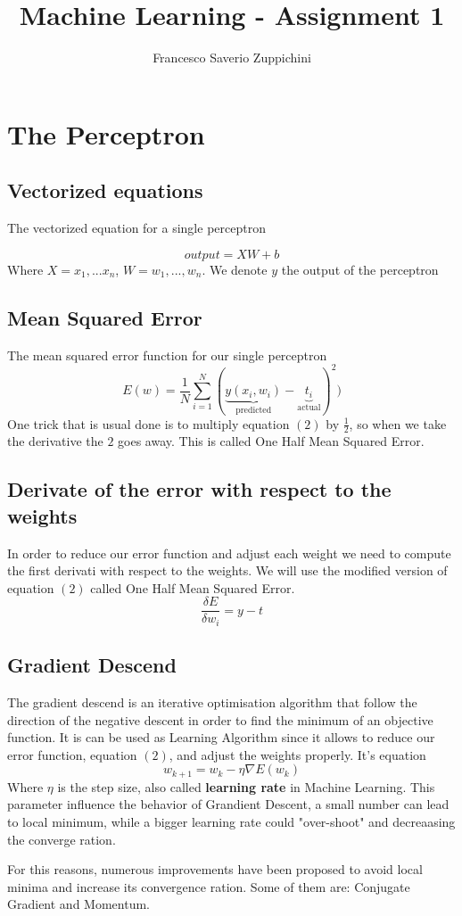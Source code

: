 \documentclass[11pt]{article}
\author{Francesco Saverio Zuppichini}
\title{Machine Learning - Assignment 1}
\begin{document}
\maketitle

\section{The Perceptron}
\subsection{Vectorized equations}
The vectorized equation for a single perceptron

\begin{equation}
output = XW + b
\end{equation}
Where $X = {x_1, ... x_n}$, $W = {w_1, ..., w_n}$. We denote $y$ the output of the perceptron

\subsection{Mean Squared Error}
The mean squared error function for our single perceptron
\begin{equation}
	E(w) = \frac{1}{N}\sum_{i = 1}^N(\underbrace{y(x_i,w_i)}_{\text{predicted}} - \underbrace{t_i}_{\text{actual}})^2)
\end{equation}
One trick that is usual done is to multiply equation $(2)$ by $\frac{1}{2}$, so when we take the derivative the $2$ goes away. This is called One Half Mean Squared Error.

\subsection{Derivate of the error with respect to the weights}
In order to reduce our error function and adjust each weight we need to compute the first derivati with respect to the weights. We will use the modified version of equation $(2)$ called One Half Mean Squared Error.
\begin{equation}
\frac{\delta E}{\delta w_i}	= y - t
	
\end{equation}
\subsection{Gradient Descend}
The gradient descend is an iterative optimisation algorithm that follow the direction of the negative descent in order to find the minimum of an objective function. It is can be used as Learning Algorithm since it allows to reduce our error function, equation $(2)$, and adjust the weights properly.
It's equation
\begin{equation}
	w_{k + 1} = w_k - \eta \nabla E(w_k)
\end{equation}
Where $\eta$ is the step size, also called \textbf{learning rate} in Machine Learning. This parameter influence the behavior of Grandient Descent, a small number can lead to local minimum, while a bigger learning rate could "over-shoot" and decreaasing the converge ration. 

For this reasons, numerous improvements have been proposed to avoid local minima and increase its convergence ration. Some of them are: Conjugate Gradient and Momentum.
\end{document}
